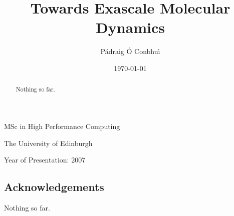 \documentclass[12pt,a4paper]{report}
\begin{document}
%
%



%
%

\author{P\'{a}draig \'{O} Conbhu\'{\i}}
\title{Towards Exascale Molecular Dynamics}
\date{\today}

\makeEPCCtitle

\thispagestyle{empty}

\vspace{12cm}

\begin{center}

\large{MSc in High Performance Computing}

\large{The University of Edinburgh}

\large{Year of Presentation: 2007}

\end{center}

\newpage


%
%

\begin{abstract}
Nothing so far.
\end{abstract}




%
%

\tableofcontents
\listoffigures


%
%

\begin{titlepage}
\vspace*{2in}

%
%

\section*{Acknowledgements}

Nothing so far.


\end{titlepage}




%
%





\end{document}
